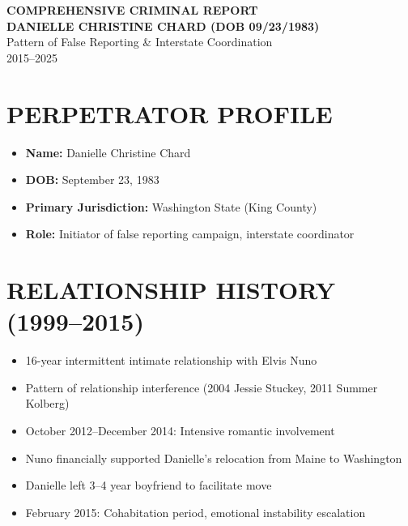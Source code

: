 \documentclass[12pt,oneside]{article}
\begin{document}
\begin{center}

{\textbf{\large COMPREHENSIVE CRIMINAL REPORT}} \\

{\textbf{DANIELLE CHRISTINE CHARD (DOB 09/23/1983)}} \\

Pattern of False Reporting \& Interstate Coordination \\

2015--2025

\end{center}

\vspace{0.3in}

\section*{PERPETRATOR PROFILE}

\begin{itemize}

\item \textbf{Name:} Danielle Christine Chard

\item \textbf{DOB:} September 23, 1983

\item \textbf{Primary Jurisdiction:} Washington State (King County)

\item \textbf{Role:} Initiator of false reporting campaign, interstate coordinator

\end{itemize}

\section*{RELATIONSHIP HISTORY (1999--2015)}

\begin{itemize}

\item 16-year intermittent intimate relationship with Elvis Nuno

\item Pattern of relationship interference (2004 Jessie Stuckey, 2011 Summer Kolberg)

\item October 2012--December 2014: Intensive romantic involvement

\item Nuno financially supported Danielle's relocation from Maine to Washington

\item Danielle left 3--4 year boyfriend to facilitate move

\item February 2015: Cohabitation period, emotional instability escalation

\end{itemize}
\end{document}
